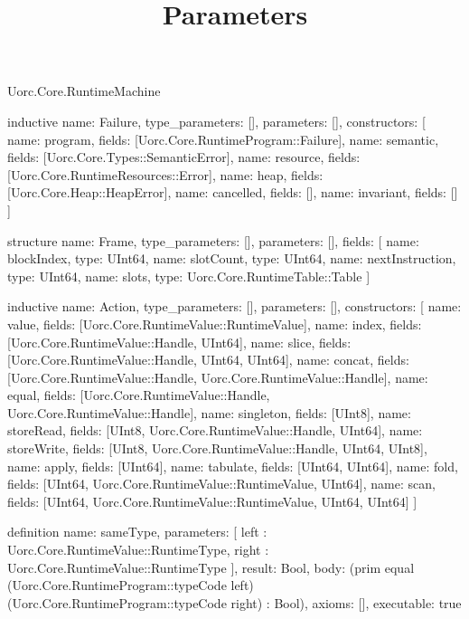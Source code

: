 \begin{lexlean}{Uorc.Core.RuntimeMachine}
\title{Parameters}
\begin{semanticmodule}
inductive{
  name: Failure,
  type_parameters: [],
  parameters: [],
  constructors: [
    {name: program, fields: [Uorc.Core.RuntimeProgram::Failure]},
    {name: semantic, fields: [Uorc.Core.Types::SemanticError]},
    {name: resource, fields: [Uorc.Core.RuntimeResources::Error]},
    {name: heap, fields: [Uorc.Core.Heap::HeapError]},
    {name: cancelled, fields: []},
    {name: invariant, fields: []}
  ]
}

structure{
  name: Frame,
  type_parameters: [],
  parameters: [],
  fields: [
    {name: blockIndex, type: UInt64},
    {name: slotCount, type: UInt64},
    {name: nextInstruction, type: UInt64},
    {name: slots, type: Uorc.Core.RuntimeTable::Table}
  ]
}

inductive{
  name: Action,
  type_parameters: [],
  parameters: [],
  constructors: [
    {name: value, fields: [Uorc.Core.RuntimeValue::RuntimeValue]},
    {name: index, fields: [Uorc.Core.RuntimeValue::Handle, UInt64]},
    {name: slice, fields: [Uorc.Core.RuntimeValue::Handle, UInt64, UInt64]},
    {name: concat, fields: [Uorc.Core.RuntimeValue::Handle, Uorc.Core.RuntimeValue::Handle]},
    {name: equal, fields: [Uorc.Core.RuntimeValue::Handle, Uorc.Core.RuntimeValue::Handle]},
    {name: singleton, fields: [UInt8]},
    {name: storeRead, fields: [UInt8, Uorc.Core.RuntimeValue::Handle, UInt64]},
    {name: storeWrite, fields: [UInt8, Uorc.Core.RuntimeValue::Handle, UInt64, UInt8]},
    {name: apply, fields: [UInt64]},
    {name: tabulate, fields: [UInt64, UInt64]},
    {name: fold, fields: [UInt64, Uorc.Core.RuntimeValue::RuntimeValue, UInt64]},
    {name: scan, fields: [UInt64, Uorc.Core.RuntimeValue::RuntimeValue, UInt64, UInt64]}
  ]
}

definition{
  name: sameType,
  parameters: [
    left : Uorc.Core.RuntimeValue::RuntimeType,
    right : Uorc.Core.RuntimeValue::RuntimeType
  ],
  result: Bool,
  body: (prim equal (Uorc.Core.RuntimeProgram::typeCode left) (Uorc.Core.RuntimeProgram::typeCode right) : Bool),
  axioms: [],
  executable: true
}


\end{semanticmodule}
\end{lexlean}
